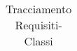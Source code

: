 \begin{longtable}{|>{\centering}m{3cm}|m{10cm}<{\centering}|}
\caption[Tracciamento Requisiti-Classi]{Tracciamento Requisiti-Classi}
\label{tabella:requi-class}
\end{longtable}
\clearpage
